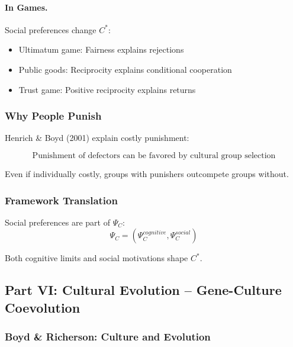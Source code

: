 \paragraph{In Games.}
Social preferences change $C^*$:
\begin{itemize}
    \item Ultimatum game: Fairness explains rejections
    \item Public goods: Reciprocity explains conditional cooperation
    \item Trust game: Positive reciprocity explains returns
\end{itemize}

\subsubsection{Why People Punish}

Henrich \& Boyd (2001) explain costly punishment:

\begin{equation}
\boxed{
\text{Punishment of defectors can be favored by cultural group selection}
}
\label{eq:henrich-boyd}
\end{equation}

Even if individually costly, groups with punishers outcompete groups without.

\subsubsection{Framework Translation}

Social preferences are part of $\Psi_C$:
\begin{equation}
\Psi_C = (\Psi_C^{cognitive}, \Psi_C^{social}) 
\end{equation}

Both cognitive limits and social motivations shape $C^*$.

\subsection{Part VI: Cultural Evolution – Gene-Culture Coevolution}

\subsubsection{Boyd \& Richerson: Culture and Evolution}

